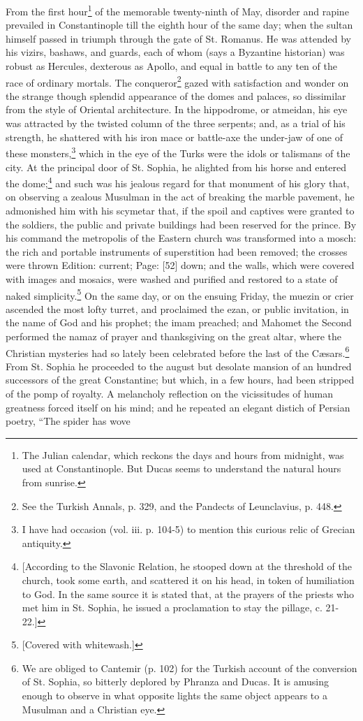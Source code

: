 From the first hour\footnote{The Julian calendar, which reckons the days and hours from midnight, was used at Constantinople. But Ducas seems to understand the natural hours from sunrise.} of the memorable twenty-ninth of May, disorder and rapine prevailed in Constantinople till the eighth hour of the same day; when the sultan himself passed in triumph through the gate of St. Romanus. He was attended by his vizirs, bashaws, and guards, each of whom (says a Byzantine historian) was robust as Hercules, dexterous as Apollo, and equal in battle to any ten of the race of ordinary mortals. The conqueror\footnote{See the Turkish Annals, p. 329, and the Pandects of Leunclavius, p. 448.} gazed with satisfaction and wonder on the strange though splendid appearance of the domes and palaces, so dissimilar from the style of Oriental architecture. In the hippodrome, or atmeidan, his eye was attracted by the twisted column of the three serpents; and, as a trial of his strength, he shattered with his iron mace or battle-axe the under-jaw of one of these monsters,\footnote{I have had occasion (vol. iii. p. 104-5) to mention this curious relic of Grecian antiquity.} which in the eye of the Turks were the idols or talismans of the city. At the principal door of St. Sophia, he alighted from his horse and entered the dome;\footnote{[According to the Slavonic Relation, he stooped down at the threshold of the church, took some earth, and scattered it on his head, in token of humiliation to God. In the same source it is stated that, at the prayers of the priests who met him in St. Sophia, he issued a proclamation to stay the pillage, c. 21-22.]} and such was his jealous regard for that monument of his glory that, on observing a zealous Musulman in the act of breaking the marble pavement, he admonished him with his scymetar that, if the spoil and captives were granted to the soldiers, the public and private buildings had been reserved for the prince. By his command the metropolis of the Eastern church was transformed into a mosch: the rich and portable instruments of superstition had been removed; the crosses were thrown Edition: current; Page: [52] down; and the walls, which were covered with images and mosaics, were washed and purified and restored to a state of naked simplicity.\footnote{[Covered with whitewash.]} On the same day, or on the ensuing Friday, the muezin or crier ascended the most lofty turret, and proclaimed the ezan, or public invitation, in the name of God and his prophet; the imam preached; and Mahomet the Second performed the namaz of prayer and thanksgiving on the great altar, where the Christian mysteries had so lately been celebrated before the last of the Cæsars.\footnote{We are obliged to Cantemir (p. 102) for the Turkish account of the conversion of St. Sophia, so bitterly deplored by Phranza and Ducas. It is amusing enough to observe in what opposite lights the same object appears to a Musulman and a Christian eye.} From St. Sophia he proceeded to the august but desolate mansion of an hundred successors of the great Constantine; but which, in a few hours, had been stripped of the pomp of royalty. A melancholy reflection on the vicissitudes of human greatness forced itself on his mind; and he repeated an elegant distich of Persian poetry, \texthebrew{“}The spider has wove 